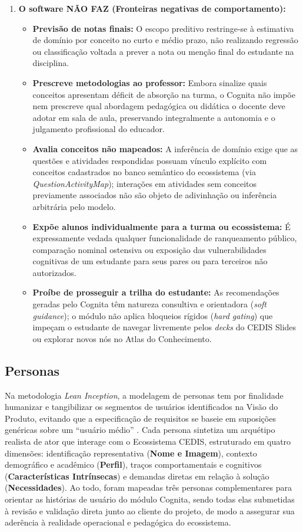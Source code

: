 \begin{enumerate}
    \item \textbf{O software NÃO FAZ (Fronteiras negativas de comportamento):}
    \begin{itemize}
        \item \textbf{Previsão de notas finais:} O escopo preditivo restringe-se à estimativa de domínio por conceito no curto e médio prazo, não realizando regressão ou classificação voltada a prever a nota ou menção final do estudante na disciplina.
        \item \textbf{Prescreve metodologias ao professor:} Embora sinalize quais conceitos apresentam déficit de absorção na turma, o Cognita não impõe nem prescreve qual abordagem pedagógica ou didática o docente deve adotar em sala de aula, preservando integralmente a autonomia e o julgamento profissional do educador.
        \item \textbf{Avalia conceitos não mapeados:} A inferência de domínio exige que as questões e atividades respondidas possuam vínculo explícito com conceitos cadastrados no banco semântico do ecossistema (via \textit{QuestionActivityMap}); interações em atividades sem conceitos previamente associados não são objeto de adivinhação ou inferência arbitrária pelo modelo.
        \item \textbf{Expõe alunos individualmente para a turma ou ecossistema:} É expressamente vedada qualquer funcionalidade de ranqueamento público, comparação nominal ostensiva ou exposição das vulnerabilidades cognitivas de um estudante para seus pares ou para terceiros não autorizados.
        \item \textbf{Proíbe de prosseguir a trilha do estudante:} As recomendações geradas pelo Cognita têm natureza consultiva e orientadora (\textit{soft guidance}); o módulo não aplica bloqueios rígidos (\textit{hard gating}) que impeçam o estudante de navegar livremente pelos \textit{decks} do CEDIS Slides ou explorar novos nós no Atlas do Conhecimento.
    \end{itemize}
\end{enumerate}

\subsection{Personas}
\label{subsec:personas}

Na metodologia \textit{Lean Inception}, a modelagem de personas tem por finalidade humanizar e tangibilizar os segmentos de usuários identificados na Visão do Produto, evitando que a especificação de requisitos se baseie em suposições genéricas sobre um ``usuário médio'' \cite{caroli_lean_2018}. Cada persona sintetiza um arquétipo realista de ator que interage com o Ecossistema CEDIS, estruturado em quatro dimensões: identificação representativa (\textbf{Nome e Imagem}), contexto demográfico e acadêmico (\textbf{Perfil}), traços comportamentais e cognitivos (\textbf{Características Intrínsecas}) e demandas diretas em relação à solução (\textbf{Necessidades}). Ao todo, foram mapeadas três personas complementares para orientar as histórias de usuário do módulo Cognita, sendo todas elas submetidas à revisão e validação direta junto ao cliente do projeto, de modo a assegurar sua aderência à realidade operacional e pedagógica do ecossistema.

